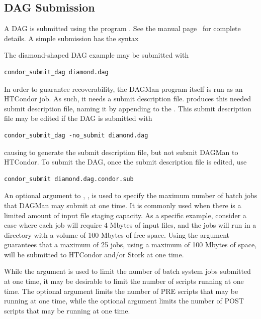 \subsection{\label{dagman:submitdag}DAG Submission}

A DAG is submitted using the program .
See the manual
page~\pageref{man-condor-submit-dag}
for complete details.
A simple submission has the syntax

 

The diamond-shaped DAG example may be submitted with

\begin{verbatim}
condor_submit_dag diamond.dag
\end{verbatim}
In order to guarantee recoverability, the DAGMan program itself
is run as an HTCondor job.
As such, it needs a submit description file.
 produces this needed submit description file,
naming it by appending  to the .
This submit description file may be edited if the DAG is
submitted with

\begin{verbatim}
condor_submit_dag -no_submit diamond.dag
\end{verbatim}
causing  to generate the submit description file,
but not submit DAGMan to HTCondor.
To submit the DAG, once the submit description file is edited,
use

\begin{verbatim}
condor_submit diamond.dag.condor.sub
\end{verbatim}

An optional argument to , , 
is used to specify the maximum number of batch jobs that DAGMan may
submit at one time.
It is commonly used when 
there is a limited amount of input file staging capacity.
As a specific example, consider a case where each job will
require 4 Mbytes of input files,
and the jobs will run in a directory with a volume of 100 Mbytes
of free space.
Using the argument  guarantees that a maximum
of 25 jobs, using a maximum of 100 Mbytes of space,
will be submitted to HTCondor and/or Stork at one time.

While the  argument is used to limit the number
of batch system jobs submitted at one time,
it may be desirable to limit the number of scripts running
at one time.
The optional  argument limits the number of PRE
scripts that may be running at one time,
while the optional  argument limits the number of POST
scripts that may be running at one time.

